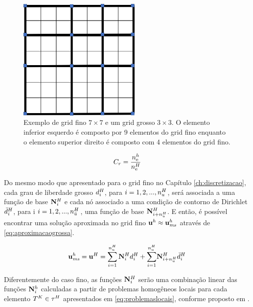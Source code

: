\begin{figure}[!htbp]
\centering
\includegraphics[width=6cm]{chap06/figs/grosso.png}
\caption{Exemplo de grid fino $7\times 7$ e um grid grosso $3\times 3$. O elemento inferior esquerdo é composto por 9 elementos do grid fino enquanto o elemento superior direito é composto com 4 elementos do grid fino.}
\label{fig:gridgrosso}
\end{figure}


\begin{equation} \label{eq:fatordeengrossamento}
    C_r = \frac{n_{\text{e}}^h}{n_{\text{e}}^H}
\end{equation}




Do mesmo modo que apresentado para o grid fino no Capítulo \ref{ch:discretizacao}, cada grau de liberdade grosso $d^H_{i}$, para $i=1, 2,..., n_u^H$, será associada a uma função de base $\mathbf{N}_{i}^H$ e cada nó associado a uma condição de contorno de Dirichlet $\bar{d}^H_{i}$, para i $i=1, 2,..., n_{\bar{u}}^H$,  uma função de base ${\mathbf{N}_{i+n_u^H}^H}$. E então, é possível encontrar uma solução aproximada no grid fino $\mathbf{u}^h \approx \mathbf{u}^h_{\textit{ms}}$ através de \eqref{eq:aproximacaogrossa}.

\begin{equation} \label{eq:aproximacaogrossa}
    \mathbf{u}^h_{\textit{ms}} = \mathbf{u}^H = \sum_{i=1}^{n_u^H} \mathbf{N}_{i}^H d^H_{i} + {\sum_{i=1}^ {n_u^H}}  {\mathbf{N}_{i+n_u^H}^H} \bar{d}^H_{i}
\end{equation}


Diferentemente do caso fino, as funções $\mathbf{N}_{i}^H$ serão uma combinação linear das funções ${\mathbf{N}_{i}^h}$ calculadas a partir de problemas homogêneos locais  para cada elemento $T^K \in \tau^H$  apresentados em \eqref{eq:problemaslocais}, conforme proposto em \cite{casteletto}.



